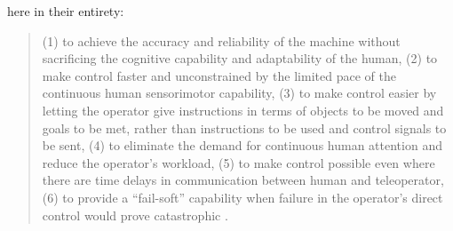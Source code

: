 here in their entirety:
\begin{quote} (1) to achieve the accuracy and reliability of the
  machine without sacrificing the cognitive capability and
  adaptability of the human,
(2) to make control faster and unconstrained by the limited pace of
  the continuous human sensorimotor capability,
(3) to make control easier by letting the operator give instructions
  in terms of objects to be moved and goals to be met, rather than
  instructions to be used and control signals to be sent,
(4) to eliminate the demand for continuous human attention and reduce
  the operator's workload,
(5) to make control possible even where there are time delays in
  communication between human and teleoperator,
(6) to provide a ``fail-soft'' capability when failure in the
  operator's direct control would prove catastrophic \cite[p. 12]{sheridan}.
\end{quote}


